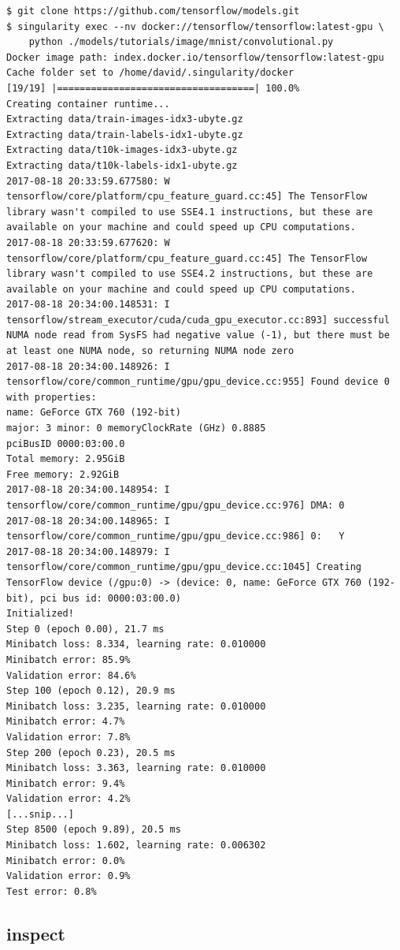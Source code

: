\documentclass[a4paper]{article}
\begin{document}
\begin{lstlisting}[frame=single]
$ git clone https://github.com/tensorflow/models.git
$ singularity exec --nv docker://tensorflow/tensorflow:latest-gpu \
    python ./models/tutorials/image/mnist/convolutional.py
Docker image path: index.docker.io/tensorflow/tensorflow:latest-gpu
Cache folder set to /home/david/.singularity/docker
[19/19] |===================================| 100.0%
Creating container runtime...
Extracting data/train-images-idx3-ubyte.gz
Extracting data/train-labels-idx1-ubyte.gz
Extracting data/t10k-images-idx3-ubyte.gz
Extracting data/t10k-labels-idx1-ubyte.gz
2017-08-18 20:33:59.677580: W tensorflow/core/platform/cpu_feature_guard.cc:45] The TensorFlow library wasn't compiled to use SSE4.1 instructions, but these are available on your machine and could speed up CPU computations.
2017-08-18 20:33:59.677620: W tensorflow/core/platform/cpu_feature_guard.cc:45] The TensorFlow library wasn't compiled to use SSE4.2 instructions, but these are available on your machine and could speed up CPU computations.
2017-08-18 20:34:00.148531: I tensorflow/stream_executor/cuda/cuda_gpu_executor.cc:893] successful NUMA node read from SysFS had negative value (-1), but there must be at least one NUMA node, so returning NUMA node zero
2017-08-18 20:34:00.148926: I tensorflow/core/common_runtime/gpu/gpu_device.cc:955] Found device 0 with properties:
name: GeForce GTX 760 (192-bit)
major: 3 minor: 0 memoryClockRate (GHz) 0.8885
pciBusID 0000:03:00.0
Total memory: 2.95GiB
Free memory: 2.92GiB
2017-08-18 20:34:00.148954: I tensorflow/core/common_runtime/gpu/gpu_device.cc:976] DMA: 0
2017-08-18 20:34:00.148965: I tensorflow/core/common_runtime/gpu/gpu_device.cc:986] 0:   Y
2017-08-18 20:34:00.148979: I tensorflow/core/common_runtime/gpu/gpu_device.cc:1045] Creating TensorFlow device (/gpu:0) -> (device: 0, name: GeForce GTX 760 (192-bit), pci bus id: 0000:03:00.0)
Initialized!
Step 0 (epoch 0.00), 21.7 ms
Minibatch loss: 8.334, learning rate: 0.010000
Minibatch error: 85.9%
Validation error: 84.6%
Step 100 (epoch 0.12), 20.9 ms
Minibatch loss: 3.235, learning rate: 0.010000
Minibatch error: 4.7%
Validation error: 7.8%
Step 200 (epoch 0.23), 20.5 ms
Minibatch loss: 3.363, learning rate: 0.010000
Minibatch error: 9.4%
Validation error: 4.2%
[...snip...]
Step 8500 (epoch 9.89), 20.5 ms
Minibatch loss: 1.602, learning rate: 0.006302
Minibatch error: 0.0%
Validation error: 0.9%
Test error: 0.8%
\end{lstlisting}


\subsection{inspect}
\label{sec:inspect}
\end{document}
